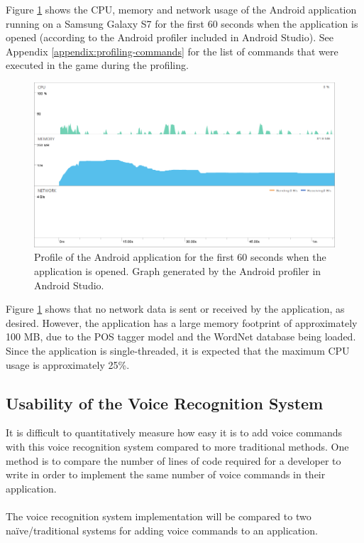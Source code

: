 \documentclass[11pt]{article}
\begin{document}
Figure \ref{fig:profiling} shows the CPU, memory and network usage of the Android application running on a Samsung Galaxy S7 for the first 60 seconds when the application is opened (according to the Android profiler included in Android Studio). See Appendix \ref{appendix:profiling-commands} for the list of commands that were executed in the game during the profiling.

\begin{figure}[H]
\begin{center}
  \includegraphics[width=\linewidth]{app-profile.png}
  \caption{Profile of the Android application for the first 60 seconds when the application is opened. Graph generated by the Android profiler in Android Studio.}
  \label{fig:profiling}
  \end{center}
\end{figure}

Figure \ref{fig:profiling} shows that no network data is sent or received by the application, as desired. However, the application has a large memory footprint of approximately 100 MB, due to the POS tagger model and the WordNet database being loaded. Since the application is single-threaded, it is expected that the maximum CPU usage is approximately 25\%.

\subsection{Usability of the Voice Recognition System}

It is difficult to quantitatively measure how easy it is to add voice commands with this voice recognition system compared to more traditional methods. One method is to compare the number of lines of code required for a developer to write in order to implement the same number of voice commands in their application.
\\
\\
The voice recognition system implementation will be compared to two na\"ive/traditional systems for adding voice commands to an application.
\end{document}
